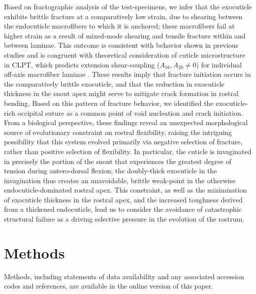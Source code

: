 \documentclass[twocolumn, linenumbers, superscriptaddress, nofootinbib]{revtex4-1}
\begin{document}
		Based on fractographic analysis of the test-specimens, we infer that the exocuticle exhibits brittle fracture at a comparatively low strain, due to shearing between the endocuticle macrofibers to which it is anchored; these macrofibers fail at higher strain as a result of mixed-mode shearing and tensile fracture within and between laminae.
		This outcome is consistent with behavior shown in previous studies and is congruent with theoretical consideration of cuticle microstructure in CLPT, which predicts extension shear-coupling ($A_{16}, A_{26}\neq{0}$) for individual off-axis macrofiber laminae \cite{Jones2014, Reddy2004}.
		These results imply that fracture initiation occurs in the comparatively brittle exocuticle, and that the reduction in exocuticle thickness in the snout apex might serve to mitigate crack formation in rostral bending.
		Based on this pattern of fracture behavior, we identified the exocuticle-rich occipital suture as a common point of void nucleation and crack initiation.
		From a biological perspective, these findings reveal an unexpected morphological source of evolutionary constraint on rostral flexibility, raising the intriguing possibility that this system evolved primarily via negative selection of fracture, rather than positive selection of flexibility.
		In particular, the cuticle is invaginated in precisely the portion of the snout that experiences the greatest degree of tension during antero-dorsal flexion; the doubly-thick exocuticle in the invagination thus creates an unavoidable, brittle weak-point in the otherwise endocuticle-dominated rostral apex.
		This constraint, as well as the minimization of exocuticle thickness in the rostral apex, and the increased toughness derived from a thickened endocuticle, lead us to consider the avoidance of catastrophic structural failure as a driving selective pressure in the evolution of the rostrum.	
		
	\section{Methods}
		Methods, including statements of data availability and any associated accession codes and references, are available in the online version of this paper.
	
\end{document}
